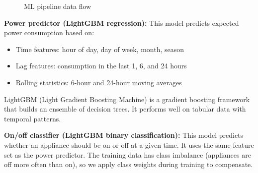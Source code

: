 \documentclass[12pt, a4paper]{article}
\begin{document}
	\begin{figure}[H]
		\centering
		\caption{ML pipeline data flow}
		\label{fig:ml-pipeline}
	\end{figure}
	
	\newpage
	\textbf{Power predictor (LightGBM regression):} This model predicts expected power consumption based on:
	
	\begin{itemize}[itemsep=2pt, topsep=4pt]
		\item Time features: hour of day, day of week, month, season
		\item Lag features: consumption in the last 1, 6, and 24 hours
		\item Rolling statistics: 6-hour and 24-hour moving averages
	\end{itemize}
	
	LightGBM (Light Gradient Boosting Machine) is a gradient boosting framework that builds an ensemble of decision trees. It performs well on tabular data with temporal patterns.
	
	\textbf{On/off classifier (LightGBM binary classification):} This model predicts whether an appliance should be on or off at a given time. It uses the same feature set as the power predictor. The training data has class imbalance (appliances are off more often than on), so we apply class weights during training to compensate.
	
\end{document}
